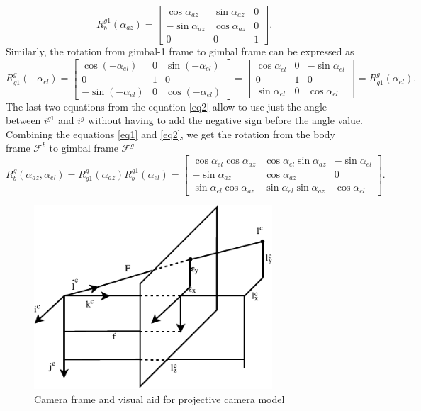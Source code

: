 \begin{equation}
R^{g1}_b(\alpha_{az}) = \begin{bmatrix}
\cos\alpha_{az} & \sin\alpha_{az} & 0 \\
-\sin\alpha_{az} & \cos\alpha_{az} & 0 \\
0 & 0 & 1
\end{bmatrix}.
\label{eq1}
\end{equation}
Similarly, the rotation from gimbal-1 frame to gimbal frame can be expressed as 
\begin{equation}
R^g_{g1}(-\alpha_{el}) = \begin{bmatrix}
\cos(-\alpha_{el}) &  0 & \sin(-\alpha_{el})\\
0 & 1 & 0 \\
-\sin(-\alpha_{el}) & 0 & \cos(-\alpha_{el})
\end{bmatrix}
= \begin{bmatrix}
\cos\alpha_{el} &  0 & -\sin\alpha_{el}\\
0 & 1 & 0 \\
\sin\alpha_{el} & 0 & \cos\alpha_{el}
\end{bmatrix} = R^g_{g1}(\alpha_{el}).
\label{eq2}
\end{equation}
The last two equations from the equation \ref{eq2} allow to use just the angle between $i^{g1}$ and $i^{g}$ without having to add the negative sign before the angle value. 
Combining the equations \ref{eq1} and \ref{eq2}, we get the rotation from the body frame $\mathcal{F}^b$ to gimbal frame $\mathcal{F}^{g}$ 
\begin{equation}
R^{g}_b(\alpha_{az}, \alpha_{el}) = R^g_{g1}(\alpha_{az})R^{g1}_b(\alpha_{el}) =
\begin{bmatrix}
\cos\alpha_{el}\cos\alpha_{az} & \cos\alpha_{el}\sin\alpha_{az} & -\sin\alpha_{el} \\
-\sin\alpha_{az} & \cos\alpha_{az} & 0 \\
\sin\alpha_{el}\cos\alpha_{az} & \sin\alpha_{el}\sin\alpha_{az} & \cos\alpha_{el}
\end{bmatrix}.
\label{eq3}
\end{equation}

\begin{figure}[htbp]
	\centering
	\includegraphics[width = 3.5in]{images/chapter2/camera_frame}
	\caption{Camera frame and visual aid for projective camera model}
	\label{camera_frame}
\end{figure}

